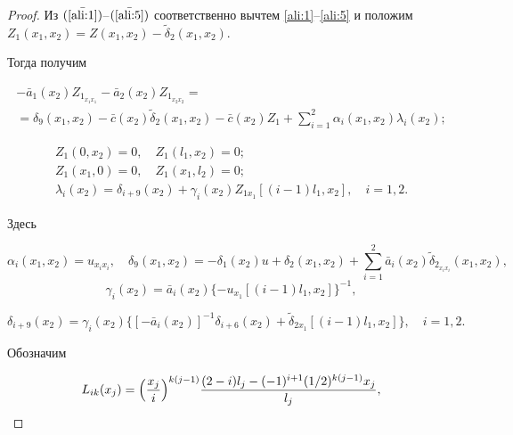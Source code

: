 \begin{proof} Из $(\bar{\text{\ref{ali:1}}})$--$(\bar{\text{\ref{ali:5}}})$ соответственно вычтем \eqref{ali:1}--\eqref{ali:5} и положим $Z_1(x_1,x_2)=Z(x_1,x_2)-\tilde{\delta}_2(x_1,x_2)$. 

Тогда получим 

\begin{multline}

\label{ali:8}

-\bar{a}_1(x_2)Z_{1_{x_1x_1}}-\bar{a}_2(x_2)Z_{1_{x_2x_2}}= \\

=\delta_9(x_1,x_2)-\bar{c}(x_2)\tilde{\delta}_2(x_1,x_2)-\bar{c}(x_2)Z_1 +\sum\limits_{i=1}^2{\alpha_i}(x_1,x_2)\lambda_i(x_2);

\end{multline}

\begin{gather}

\label{ali:10}

Z_1(0,x_2)=0, \quad Z_1(l_1,x_2)=0;

\\

\label{ali:10}

Z_1(x_1,0)=0, \quad Z_1(x_1,l_2)=0;

\\

\label{ali:11}

\lambda_i(x_2)=\delta_{i+9}(x_2)+\gamma_i(x_2) Z_{1x_1}[(i-1)l_1, x_2], \quad i=1, 2. 

\end{gather}

Здесь 

$$\alpha_i(x_1,x_2)=u_{x_ix_i},\quad  \delta_9(x_1,x_2)=-\delta_1(x_2)u+\delta_2(x_1,x_2)+\sum\limits_{i=1}^2\bar{a}_i(x_2)\tilde{\delta}_{2_{x_ix_i}}(x_1,x_2),$$ $$\gamma_i(x_2)=\bar{a}_i(x_2)\{-u_{x_1}[(i - 1)l_1,x_2]\}^{-1},$$

$$\delta_{i+9}(x_2)= \gamma_i(x_2) \bigl\{ [-\bar{a}_i(x_2)]^{-1}\delta_{i+6}(x_2)    +

\tilde \delta _{2 x_1} [(i-1)l_1, x_2 ]

  \bigr\} , \quad i=1, 2.$$



Обозначим

\begin{gather*}

L_{ik}(x_j)=\Bigl(\frac{x_j}{i}\Bigr)^{k(j-1)}\frac{(2-i)l_j-(-1)^{i+1}({1}/{2})^{k(j-1)}x_j}{l_j},


\end{gather*}
\end{proof}
